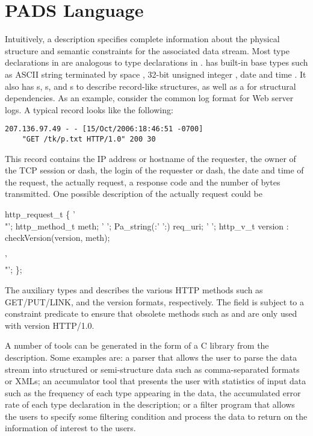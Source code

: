 \documentclass{article}
\begin{document}
\section{PADS Language}
Intuitively, a \padsc{} description specifies complete information
about the physical structure and semantic constraints for the associated
data stream. Most type declarations in \padsc{} are analogous to type
declarations in \C{}. \padsc{} has built-in base types such as
ASCII string terminated by space ,
32-bit unsigned integer , date  and time .
It also has s, s, and s to describe
record-like structures, as well as a  for structural
dependencies.
As an example, consider the common log format for Web server logs.  A
typical record looks like the following:
{\small \begin{verbatim}
207.136.97.49 - - [15/Oct/2006:18:46:51 -0700] 
	"GET /tk/p.txt HTTP/1.0" 200 30
\end{verbatim}
}

This record contains the IP address or hostname of the requester, the owner of
the TCP session or dash, the login of the requester or dash, the date and time of 
the request, the actually request, a response code and the number of bytes transmitted.
One possible \padsc{} description of the actually request could be
\begin{code}
 http_request_t \{
  '\\"'; http_method_t    meth;           
  ' ';  Pa_string(:' ':) req_uri;        
  ' ';  http_v_t version : 
	checkVersion(version, meth);
                                         
  '\\"';
\};
\end{code}

The auxiliary types  and  describes the various
HTTP methods such as GET/PUT/LINK, and the version formats, respectively.
The  field is subject to a constraint predicate 
to ensure that obsolete methods such as  and  are only
used with version HTTP/1.0.

A number of tools can be generated in the form of a C library from the
\padsc{} description. Some examples are: a parser that allows the user to
parse the data stream into structured or semi-structure data such as
comma-separated formats or XMLs; an accumulator tool that presents the user with 
statistics of input data such as the frequency of each type appearing in
the data, the accumulated error rate of each type declaration in the
\padsc{} description; or a filter program that allows the users to specify
some filtering condition and process the data to return on the information
of interest to the users. 
\end{document}
